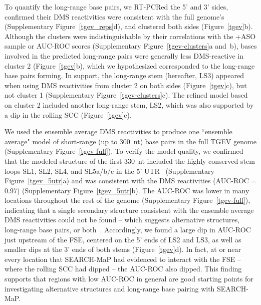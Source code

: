 \documentclass[main.tex]{subfiles}
\begin{document}
To quantify the long-range base pairs, we RT-PCRed the 5' and 3' sides, confirmed their DMS reactivities were consistent with the full genome's (Supplementary Figure~\ref{tgev_reps}d), and clustered both sides (Figure~\ref{tgev}b).
Although the clusters were indistinguishable by their correlations with the +ASO sample or AUC-ROC scores (Supplementary Figure~\ref{tgev-clusters}a and~b), bases involved in the predicted long-range pairs were generally less DMS-reactive in cluster 2 (Figure~\ref{tgev}b), which we hypothesized corresponded to the long-range base pairs forming.
In support, the long-range stem (hereafter, LS3) appeared when using DMS reactivities from cluster 2 on both sides (Figure~\ref{tgev}c), but not cluster 1 (Supplementary Figure~\ref{tgev-clusters}c).
The refined model based on cluster 2 included another long-range stem, LS2, which was also supported by a dip in the rolling SCC (Figure~\ref{tgev}c).

We used the ensemble average DMS reactivities to produce one ``ensemble average" model of short-range (up to 300~nt) base pairs in the full TGEV genome (Supplementary Figure~\ref{tgev-full}).
To verify the model quality, we confirmed that the modeled structure of the first 330~nt included the highly conserved stem loops SL1, SL2, SL4, and SL5a/b/c in the 5' UTR~\cite{Yang2015a} (Supplementary Figure~\ref{tgev_5utr}a) and was consistent with the DMS reactivities (AUC-ROC = 0.97) (Supplementary Figure~\ref{tgev_5utr}b).
The AUC-ROC was lower in many locations throughout the rest of the genome (Supplementary Figure~\ref{tgev-full}), indicating that a single secondary structure consistent with the ensemble average DMS reactivities could not be found -- which suggests alternative structures, long-range base pairs, or both~\cite{Lan2022}.
Accordingly, we found a large dip in AUC-ROC just upstream of the FSE, centered on the 5' ends of LS2 and LS3, as well as smaller dips at the 3' ends of both stems (Figure~\ref{tgev}d).
In fact, at or near every location that SEARCH-MaP had evidenced to interact with the FSE -- where the rolling SCC had dipped -- the AUC-ROC also dipped.
This finding supports that regions with low AUC-ROC in general are good starting points for investigating alternative structures and long-range base pairing with SEARCH-MaP.
\end{document}
